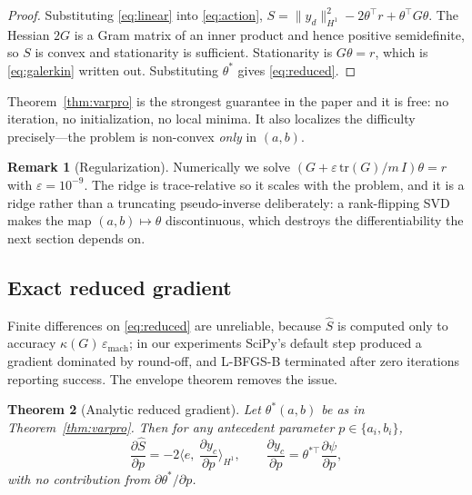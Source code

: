 \documentclass[11pt]{article}
\theoremstyle{plain}
\newtheorem{theorem}{Theorem}
\theoremstyle{definition}
\newtheorem{remark}[theorem]{Remark}
\begin{document}
\begin{proof}
Substituting \eqref{eq:linear} into \eqref{eq:action},
$S=\|y_d\|^2_{H^1}-2\theta^\top r+\theta^\top G\theta$. The Hessian $2G$ is a
Gram matrix of an inner product and hence positive semidefinite, so $S$ is
convex and stationarity is sufficient. Stationarity is $G\theta=r$, which is
\eqref{eq:galerkin} written out. Substituting $\theta^{*}$ gives
\eqref{eq:reduced}.
\end{proof}

Theorem~\ref{thm:varpro} is the strongest guarantee in the paper and it is
free: no iteration, no initialization, no local minima. It also localizes the
difficulty precisely---the problem is non-convex \emph{only} in $(a,b)$.

\begin{remark}[Regularization]
Numerically we solve $(G+\varepsilon\,\mathrm{tr}(G)/m\,I)\theta=r$ with
$\varepsilon=10^{-9}$. The ridge is trace-relative so it scales with the
problem, and it is a ridge rather than a truncating pseudo-inverse
deliberately: a rank-flipping SVD makes the map $(a,b)\mapsto\theta$
discontinuous, which destroys the differentiability the next section depends on.
\end{remark}

\subsection{Exact reduced gradient}

Finite differences on \eqref{eq:reduced} are unreliable, because $\widehat S$ is
computed only to accuracy $\kappa(G)\,\varepsilon_{\text{mach}}$; in our
experiments SciPy's default step produced a gradient dominated by round-off, and
L-BFGS-B terminated after zero iterations reporting success. The envelope
theorem removes the issue.

\begin{theorem}[Analytic reduced gradient]
\label{thm:grad}
Let $\theta^{*}(a,b)$ be as in Theorem~\ref{thm:varpro}. Then for any
antecedent parameter $p\in\{a_i,b_i\}$,
\begin{equation}
\frac{\partial\widehat S}{\partial p}
=-2\Big\langle e,\ \frac{\partial y_c}{\partial p}\Big\rangle_{H^1},
\qquad
\frac{\partial y_c}{\partial p}=\theta^{*\top}\frac{\partial\psi}{\partial p},
\label{eq:grad}
\end{equation}
with no contribution from $\partial\theta^{*}/\partial p$.
\end{theorem}
\end{document}
